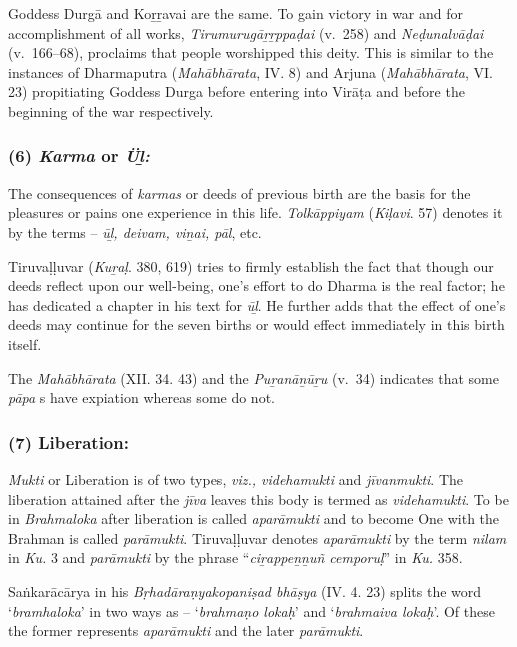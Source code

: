 \vskip -7.5pt

Goddess Durgā and Koṟṟavai are the same. To gain victory in war and for accomplishment of all works, \textit{Tirumurugāṟṟppaḍai} (v.~258) and \textit{Neḍunalvāḍai} (v.~166–68), proclaims that people worshipped this deity. This is similar to the instances of Dharmaputra (\textit{Mahābhārata}, IV. 8) and Arjuna (\textit{Mahābhārata}, VI. 23) propitiating Goddess Durga before entering into Virāṭa and before the beginning of the war respectively.


\subsubsection*{(6) \textit{Karma} or \textit{Üḻ:}}

\vskip -7.5pt

The consequences of \textit{karmas} or deeds of previous birth are the basis for the pleasures or pains one experience in this life. \textit{Tolkāppiyam} (\textit{Kiḷavi}. 57) denotes it by the terms – \textit{ūḻ, deivam, viṉai, pāl}, etc.

Tiruvaḷḷuvar (\textit{Kuṟaḷ}. 380, 619) tries to firmly establish the fact that though our deeds reflect upon our well-being, one’s effort to do Dharma is the real factor; he has dedicated a chapter in his text for \textit{ūḻ}. He further adds that the effect of one’s deeds may continue for the seven births or would effect immediately in this birth itself.

The \textit{Mahābhārata} (XII. 34. 43) and the \textit{Puṟanāṉūṟu} (v.~34) indicates that some \textit{pāpa} s have expiation whereas some do not.


\subsubsection*{(7) Liberation:}

\vskip -7.5pt

\textit{Mukti} or Liberation is of two types, \textit{viz., videhamukti} and \textit{jīvanmukti}. The liberation attained after the \textit{jīva} leaves this body is termed as \textit{videhamukti}. To be in \textit{Brahmaloka} after liberation is called \textit{aparāmukti} and to become One with the Brahman is called \textit{parāmukti}. Tiruvaḷḷuvar denotes \textit{aparāmukti} by the term \textit{nilam} in \textit{Ku.} 3 and \textit{parāmukti} by the phrase “\textit{ciṟappeṉṉuñ cemporuḷ}” in \textit{Ku.} 358.

Saṅkarācārya in his \textit{Bṛhadāraṇyakopaniṣad bhāṣya} (IV. 4. 23) splits the word ‘\textit{bramhaloka}’ in two ways as – ‘\textit{brahmaṇo lokaḥ}’ and ‘\textit{brahmaiva lokaḥ}’. Of these the former represents \textit{aparāmukti} and the later \textit{parāmukti}.

